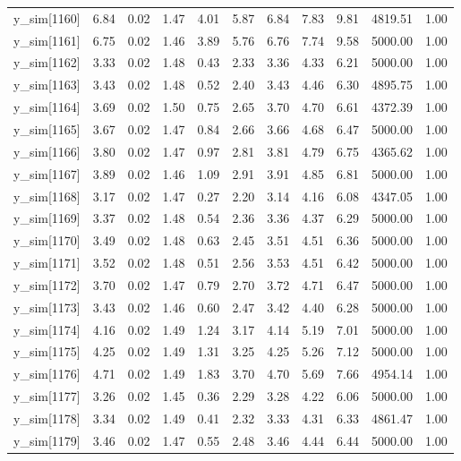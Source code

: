 \begin{table}[ht]
\begin{tabular}{rrrrrrrrrrr}
  y\_sim[1160] & 6.84 & 0.02 & 1.47 & 4.01 & 5.87 & 6.84 & 7.83 & 9.81 & 4819.51 & 1.00 \\ 
  y\_sim[1161] & 6.75 & 0.02 & 1.46 & 3.89 & 5.76 & 6.76 & 7.74 & 9.58 & 5000.00 & 1.00 \\ 
  y\_sim[1162] & 3.33 & 0.02 & 1.48 & 0.43 & 2.33 & 3.36 & 4.33 & 6.21 & 5000.00 & 1.00 \\ 
  y\_sim[1163] & 3.43 & 0.02 & 1.48 & 0.52 & 2.40 & 3.43 & 4.46 & 6.30 & 4895.75 & 1.00 \\ 
  y\_sim[1164] & 3.69 & 0.02 & 1.50 & 0.75 & 2.65 & 3.70 & 4.70 & 6.61 & 4372.39 & 1.00 \\ 
  y\_sim[1165] & 3.67 & 0.02 & 1.47 & 0.84 & 2.66 & 3.66 & 4.68 & 6.47 & 5000.00 & 1.00 \\ 
  y\_sim[1166] & 3.80 & 0.02 & 1.47 & 0.97 & 2.81 & 3.81 & 4.79 & 6.75 & 4365.62 & 1.00 \\ 
  y\_sim[1167] & 3.89 & 0.02 & 1.46 & 1.09 & 2.91 & 3.91 & 4.85 & 6.81 & 5000.00 & 1.00 \\ 
  y\_sim[1168] & 3.17 & 0.02 & 1.47 & 0.27 & 2.20 & 3.14 & 4.16 & 6.08 & 4347.05 & 1.00 \\ 
  y\_sim[1169] & 3.37 & 0.02 & 1.48 & 0.54 & 2.36 & 3.36 & 4.37 & 6.29 & 5000.00 & 1.00 \\ 
  y\_sim[1170] & 3.49 & 0.02 & 1.48 & 0.63 & 2.45 & 3.51 & 4.51 & 6.36 & 5000.00 & 1.00 \\ 
  y\_sim[1171] & 3.52 & 0.02 & 1.48 & 0.51 & 2.56 & 3.53 & 4.51 & 6.42 & 5000.00 & 1.00 \\ 
  y\_sim[1172] & 3.70 & 0.02 & 1.47 & 0.79 & 2.70 & 3.72 & 4.71 & 6.47 & 5000.00 & 1.00 \\ 
  y\_sim[1173] & 3.43 & 0.02 & 1.46 & 0.60 & 2.47 & 3.42 & 4.40 & 6.28 & 5000.00 & 1.00 \\ 
  y\_sim[1174] & 4.16 & 0.02 & 1.49 & 1.24 & 3.17 & 4.14 & 5.19 & 7.01 & 5000.00 & 1.00 \\ 
  y\_sim[1175] & 4.25 & 0.02 & 1.49 & 1.31 & 3.25 & 4.25 & 5.26 & 7.12 & 5000.00 & 1.00 \\ 
  y\_sim[1176] & 4.71 & 0.02 & 1.49 & 1.83 & 3.70 & 4.70 & 5.69 & 7.66 & 4954.14 & 1.00 \\ 
  y\_sim[1177] & 3.26 & 0.02 & 1.45 & 0.36 & 2.29 & 3.28 & 4.22 & 6.06 & 5000.00 & 1.00 \\ 
  y\_sim[1178] & 3.34 & 0.02 & 1.49 & 0.41 & 2.32 & 3.33 & 4.31 & 6.33 & 4861.47 & 1.00 \\ 
  y\_sim[1179] & 3.46 & 0.02 & 1.47 & 0.55 & 2.48 & 3.46 & 4.44 & 6.44 & 5000.00 & 1.00 \\ 

\end{tabular}
\end{table}
